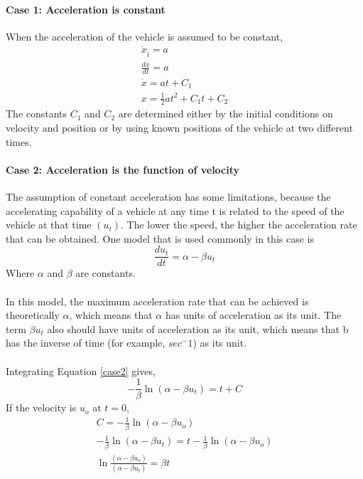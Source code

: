 \paragraph{Case 1: Acceleration is constant}
When the acceleration of the vehicle is assumed to be constant,
\begin{gather}
	\ddot{x}_{\hat{i}} = a\\
	\frac{d\dot{x}}{dt} = a\\
	\dot{x} = a t + C_1\\
	x =\frac{1}{2}a t^2 + C_1t+ C_2
\end{gather}
The constants $C_1$ and $C_2$ are determined either by the initial conditions on velocity and position or by using known positions of the vehicle at two different times.
\paragraph{Case 2: Acceleration is the function of velocity}
The assumption of constant acceleration has some limitations, because the accelerating capability of a vehicle at any time t is related to the speed of the vehicle at that time $(u_t)$. The lower the speed, the higher the acceleration rate that can be obtained. One model that is used commonly in this case is\\
\begin{equation}
	\label{case2}
	\frac{du_t}{dt} = \alpha - \beta u_t
\end{equation}
Where $\alpha$ and $\beta$ are constants.\\\\
In this model, the maximum acceleration rate that can be achieved is theoretically $\alpha$, which means that $\alpha$ has units of acceleration as its unit. The term $\beta u_t$ also should have units of acceleration as its unit, which means that b has the inverse of time (for example, $sec^-1$) as its unit.\\\\
Integrating Equation \ref{case2} gives,
\begin{equation*}
	-\frac{1}{\beta}\ln (\alpha - \beta u_t) = t + C
\end{equation*}
If the velocity is $u_o$ at $t = 0$,
\begin{gather*}
	C = -\frac{1}{\beta}\ln (\alpha - \beta u_o)\\
	-\frac{1}{\beta}\ln (\alpha - \beta u_t) = t  -\frac{1}{\beta}\ln (\alpha - \beta u_o)\\
	\ln\frac{(\alpha - \beta u_o)}{(\alpha - \beta u_t)} = \beta t\\
\end{gather*}

